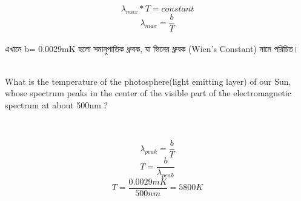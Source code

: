 \documentclass{article}
\begin{document}
$$\lambda_{max} * T = constant $$
$$\boxed{\lambda_{max}=\frac{b}{T}}$$
\\{\bn এখানে b= 0.0029mK হলো সমানুপাতিক ধ্রুবক, যা ভিনের ধ্রুবক (Wien’s Constant) নামে পরিচিত।}
\\ 
\\
\newpage 
\begin{tcolorbox}[colback=blue!5!white,
                  colframe=blue!75!black,
                  title=Problem 1]
What is the temperature of the photosphere(light emitting layer) of our Sun, whose spectrum peaks in the center of the visible part of the electromagnetic spectrum at about 500nm ?
\end{tcolorbox}
\\
\begin{tcolorbox}[colback=blue!5!white,
                  colframe=blue!75!black,
                  title=Solution]
$$\lambda_{peak}=\frac{b}{T} $$ 
$$T=\frac{b}{\lambda_{peak}}$$
$$T=\frac{0.0029mK}{500nm}=5800K$$
\end{tcolorbox}
\end{document}
